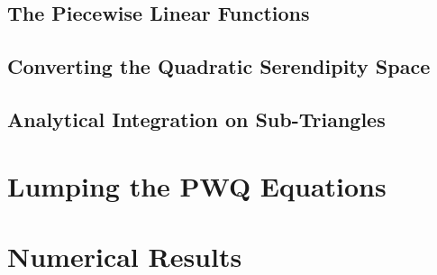 \documentclass[preprint,review,10pt]{elsarticle}
\begin{document}
\subsection{The Piecewise Linear Functions} \label{sec::PWQ_PWL}

\subsection{Converting the Quadratic Serendipity Space} \label{sec::PWQ_Ser}

\subsection{Analytical Integration on Sub-Triangles} \label{sec::PWQ_Int}

\section{Lumping the PWQ Equations} \label{sec::Lumping}


\section{Numerical Results} \label{sec::results}



\end{document}
